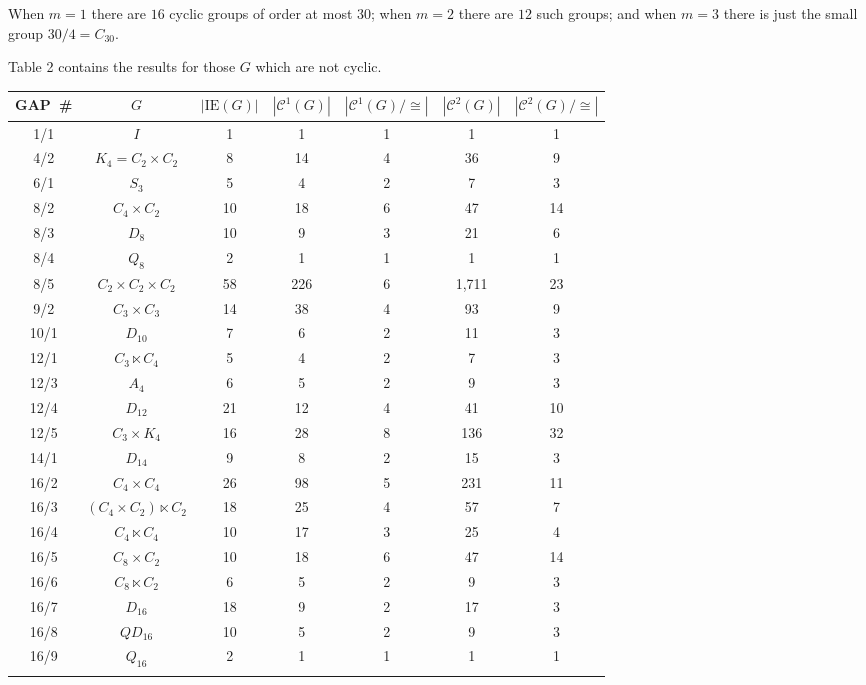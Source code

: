 \documentclass{ws-ijac}
\newcommand{\GAP}      {{\sf GAP}}
\newcommand{\calC}{\mathcal{C}}
\begin{document}
\noindent
When $m=1$ there are $16$ cyclic groups of order at most $30$; 
when $m=2$ there are $12$ such groups; 
and when $m=3$ there is just the small group $30/4 = C_{30}$. 

Table 2 contains the results for those $G$ which are not cyclic. 

\begin{table}[h!]
{\begin{tabular}{@{}ccccccc@{}} \toprule
	{\GAP\ }\# 
	    & $G$ 
	        & $|\mathrm{IE}(G)|$ 
	            & $|\calC^1(G)|$ 
	                & $|\calC^1(G)/\cong |$ 
	                    & $|\calC^{2}(G)|$ 
	                        & $|\calC^{2}(G)/\cong |$  \\ 
\hline 
	1/1 & $I$ & 1 & 1 & 1 & 1 & 1 \\ 
	4/2 & $K_4 = C_2 \times C_2$ & 8 & 14 & 4 & 36 & 9 \\ 
	6/1 & $S_3$ & 5 & 4 & 2 & 7 & 3 \\ 
	8/2 & $C_4 \times C_2$ & 10 & 18 & 6 & 47 & 14 \\ 
	8/3 & $D_8$ & 10 & 9 & 3 & 21 & 6 \\ 
	8/4 & $Q_8$ & 2 & 1 & 1 & 1 & 1 \\ 
	8/5 & $C_2 \times C_2 \times C_2$ & 58 & 226 & 6 & 1,711 & 23 \\ 
	9/2 & $C_3 \times C_3$ & 14 & 38 & 4 & 93 & 9 \\ 
	10/1 & $D_{10}$ & 7 & 6 & 2 & 11 & 3 \\ 
	12/1 & $C_3 \ltimes C_4$ & 5 & 4 & 2 & 7 & 3 \\ 
	12/3 & $A_4$ & 6 & 5 & 2 & 9 & 3 \\ 
	12/4 & $D_{12}$ & 21 & 12 & 4 & 41 & 10 \\ 
	12/5 & $C_3 \times K_4$ & 16 & 28 & 8 & 136 & 32 \\ 
	14/1 & $D_{14}$ & 9 & 8 & 2 & 15 & 3 \\ 
	16/2 & $C_4 \times C_4$ & 26 & 98 & 5 & 231 & 11 \\ 
	16/3 & $(C_4 \times C_2) \ltimes C_2$ & 18 & 25 & 4 & 57 & 7 \\ 
	16/4 & $C_4 \ltimes C_4$ & 10 & 17 & 3 & 25 & 4 \\ 
	16/5 & $C_8 \times C_2$ & 10 & 18 & 6 & 47 & 14 \\ 
	16/6 & $C_8 \ltimes C_2$ & 6 & 5 & 2 & 9 & 3 \\ 
	16/7 & $D_{16}$ & 18 & 9 & 2 & 17 & 3 \\ 
	16/8 & $QD_{16}$ & 10 & 5 & 2 & 9 & 3 \\ 
	16/9 & $Q_{16}$ & 2 & 1 & 1 & 1 & 1 \\
\botrule
\end{tabular}}
\end{table}
\end{document}
